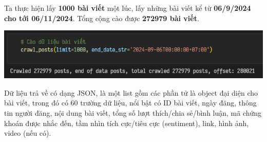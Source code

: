 Ta thực hiện lấy \textbf{1000 bài viết} một lúc, lấy những bài viết kể từ \textbf{06/9/2024 cho tới 06/11/2024}. Tổng cộng cào được \textbf{272979 bài viết}.

\begin{center}
    \includegraphics[width=1\linewidth]{images/code-1.6-crawlresult.png}
\end{center}

Dữ liệu trả về có dạng JSON, là một list gồm các phần tử là object đại diện cho bài viết, trong đó có 60 trường dữ liệu, nổi bật có ID bài viết, ngày đăng, thông tin người đăng, nội dung bài viết, tổng số lượt thích/chia sẻ/bình luận, mã chứng khoán được nhắc đến, tầm nhìn tích cực/tiêu cực (sentiment), link, hình ảnh, video (nếu có).\\

